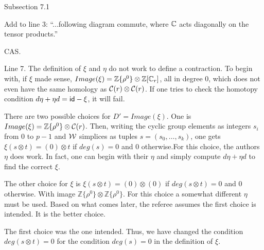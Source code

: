 Subsection 7.1

\subitem Add to line 3: ``...following diagram commute, where $\mathbb{C}$ acts diagonally on the tensor products.''

\ar CAS.

\subitem Line 7.
The definition of $\xi$ and $\eta$ do not work to define a contraction.
To begin with, if $\xi$ made sense, $Image(\xi) = \mathbb{Z}\{\rho^0\}\otimes \mathbb{Z}[\mathbb{C}_r]$, all in degree $0$, which does not even have the same homology as $\mathcal{C}(r)\otimes \mathcal{C}(r)$.
If one tries to check the homotopy condition $d\eta+\eta d = \mathsf{id}-\xi$, it will fail.

There are two possible choices for $D'=Image(\xi)$.
One is $Image(\xi) = \mathbb{Z}\{\rho^0\}\otimes \mathcal{C}(r)$.
Then, writing the cyclic group elements as integers $s_i$ from $0$ to $p-1$ and $\mathcal{W}$ simplices as tuples $s = (s_0,\ldots,s_k)$, one gets $\xi(s\otimes t) = (0)\otimes t$ if $deg(s) = 0$ and $0$ otherwise.For this choice, the authors $\eta$ does work.
In fact, one can begin with their $\eta$ and simply compute $d\eta+\eta d$ to find the correct $\xi$.

The other choice for $\xi$ is $\xi(s\otimes t) = (0)\otimes (0)$ if $deg(s\otimes t)=0$ and $0$ otherwise.
With image $\mathbb{Z}\{\rho^0\}\otimes \mathbb{Z}\{\rho^0\}$.
For this choice a somewhat different $\eta$ must be used.
Based on what comes later, the referee assumes the first choice is intended.
It is the better choice.

\ar The first choice was the one intended.
Thus, we have changed the condition $deg(s\otimes t) = 0$ for the condition $deg(s) = 0$ in the definition of $\xi$.